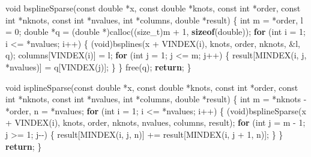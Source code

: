 \documentclass[
  12pt,
]{article}
\newenvironment{Shaded}{\begin{snugshade}}{\end{snugshade}}
\newcommand{\ControlFlowTok}[1]{\textcolor[rgb]{0.13,0.29,0.53}{\textbf{#1}}}
\newcommand{\DataTypeTok}[1]{\textcolor[rgb]{0.13,0.29,0.53}{#1}}
\newcommand{\DecValTok}[1]{\textcolor[rgb]{0.00,0.00,0.81}{#1}}
\newcommand{\KeywordTok}[1]{\textcolor[rgb]{0.13,0.29,0.53}{\textbf{#1}}}
\newcommand{\NormalTok}[1]{#1}
\begin{document}
\begin{Shaded}
\begin{Highlighting}[]
\DataTypeTok{void}\NormalTok{ bsplineSparse(}\DataTypeTok{const} \DataTypeTok{double}\NormalTok{ *x, }\DataTypeTok{const} \DataTypeTok{double}\NormalTok{ *knots, }\DataTypeTok{const} \DataTypeTok{int}\NormalTok{ *order,}
                   \DataTypeTok{const} \DataTypeTok{int}\NormalTok{ *nknots, }\DataTypeTok{const} \DataTypeTok{int}\NormalTok{ *nvalues, }\DataTypeTok{int}\NormalTok{ *columns,}
                   \DataTypeTok{double}\NormalTok{ *result) \{}
    \DataTypeTok{int}\NormalTok{ m = *order, l = }\DecValTok{0}\NormalTok{;}
    \DataTypeTok{double}\NormalTok{ *q = (}\DataTypeTok{double}\NormalTok{ *)calloc((}\DataTypeTok{size\_t}\NormalTok{)m + }\DecValTok{1}\NormalTok{, }\KeywordTok{sizeof}\NormalTok{(}\DataTypeTok{double}\NormalTok{));}
    \ControlFlowTok{for}\NormalTok{ (}\DataTypeTok{int}\NormalTok{ i = }\DecValTok{1}\NormalTok{; i \textless{}= *nvalues; i++) \{}
\NormalTok{        (}\DataTypeTok{void}\NormalTok{)bsplines(x + VINDEX(i), knots, order, nknots, \&l, q);}
\NormalTok{        columns[VINDEX(i)] = l;}
        \ControlFlowTok{for}\NormalTok{ (}\DataTypeTok{int}\NormalTok{ j = }\DecValTok{1}\NormalTok{; j \textless{}= m; j++) \{}
\NormalTok{            result[MINDEX(i, j, *nvalues)] = q[VINDEX(j)];}
\NormalTok{        \}}
\NormalTok{    \}}
\NormalTok{    free(q);}
    \ControlFlowTok{return}\NormalTok{;}
\NormalTok{\}}

\DataTypeTok{void}\NormalTok{ isplineSparse(}\DataTypeTok{const} \DataTypeTok{double}\NormalTok{ *x, }\DataTypeTok{const} \DataTypeTok{double}\NormalTok{ *knots, }\DataTypeTok{const} \DataTypeTok{int}\NormalTok{ *order,}
                   \DataTypeTok{const} \DataTypeTok{int}\NormalTok{ *nknots, }\DataTypeTok{const} \DataTypeTok{int}\NormalTok{ *nvalues, }\DataTypeTok{int}\NormalTok{ *columns,}
                   \DataTypeTok{double}\NormalTok{ *result) \{}
    \DataTypeTok{int}\NormalTok{ m = *nknots {-} *order, n = *nvalues;}
    \ControlFlowTok{for}\NormalTok{ (}\DataTypeTok{int}\NormalTok{ i = }\DecValTok{1}\NormalTok{; i \textless{}= *nvalues; i++) \{}
\NormalTok{        (}\DataTypeTok{void}\NormalTok{)bsplineSparse(x + VINDEX(i), knots, order, nknots, nvalues,}
\NormalTok{                            columns, result);}
        \ControlFlowTok{for}\NormalTok{ (}\DataTypeTok{int}\NormalTok{ j = m {-} }\DecValTok{1}\NormalTok{; j \textgreater{}= }\DecValTok{1}\NormalTok{; j{-}{-}) \{}
\NormalTok{            result[MINDEX(i, j, n)] += result[MINDEX(i, j + }\DecValTok{1}\NormalTok{, n)];}
\NormalTok{        \}}
\NormalTok{    \}}
    \ControlFlowTok{return}\NormalTok{;}
\NormalTok{\}}
\end{Highlighting}
\end{Shaded}
\end{document}
